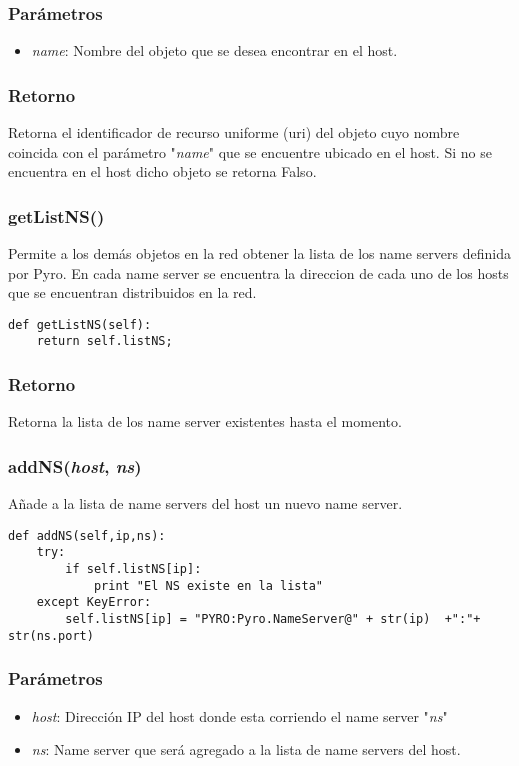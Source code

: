 \documentclass{article}
\begin{document}
\subsubsection*{Parámetros}
\begin{itemize}
\item \textit{name}: Nombre del objeto que se desea encontrar en el host.
\end{itemize}
\subsubsection*{Retorno}
Retorna el identificador de recurso uniforme (uri) del objeto cuyo nombre coincida con el parámetro "\textit{name}" que se encuentre ubicado en el host. Si no se encuentra en el host dicho objeto se retorna Falso.
\subsubsection{\textbf{getListNS}()}
Permite a los demás objetos en la red obtener la lista de los name servers definida por Pyro. En cada name server se encuentra la direccion de cada uno de los hosts que se encuentran distribuidos en la red.
\begin{lstlisting}
def getListNS(self):
	return self.listNS;
\end{lstlisting}
\subsubsection*{Retorno}
Retorna la lista de los name server existentes hasta el momento.
\subsubsection{\textbf{addNS}(\textit{host}, \textit{ns})}
Añade a la lista de name servers del host un nuevo name server.
\begin{lstlisting}
def addNS(self,ip,ns):
	try:
		if self.listNS[ip]:
			print "El NS existe en la lista"
	except KeyError:
		self.listNS[ip] = "PYRO:Pyro.NameServer@" + str(ip)  +":"+ str(ns.port)
\end{lstlisting}
\subsubsection*{Parámetros}
\begin{itemize}
\item \textit{host}: Dirección IP del host donde esta corriendo el name server "\textit{ns}"
\item \textit{ns}: Name server que será agregado a la lista de name servers del host.
\end{itemize}
\end{document}
